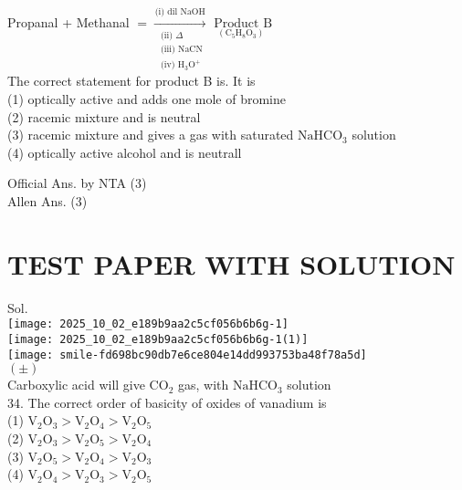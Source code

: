 \documentclass[10pt]{article}
\begin{document}
Propanal + Methanal \(=\xrightarrow[\substack{\text { (ii) } \Delta \\ \text { (iii) } \mathrm{NaCN} \\ \text { (iv) } \mathrm{H}_{3} \mathrm{O}^{+}}]{\text {(i) dil } \mathrm{NaOH}} \underset{\left(\mathrm{C}_{5} \mathrm{H}_{8} \mathrm{O}_{3}\right)}{\text { Product } \mathrm{B}}\)\\
The correct statement for product B is. It is\\
(1) optically active and adds one mole of bromine\\
(2) racemic mixture and is neutral\\
(3) racemic mixture and gives a gas with saturated \(\mathrm{NaHCO}_{3}\) solution\\
(4) optically active alcohol and is neutrall

Official Ans. by NTA (3)\\
Allen Ans. (3)

\section*{TEST PAPER WITH SOLUTION}
Sol.\\
\texttt{[image: 2025\_10\_02\_e189b9aa2c5cf056b6b6g-1]}\\
\texttt{[image: 2025\_10\_02\_e189b9aa2c5cf056b6b6g-1(1)]}\\
\texttt{[image: smile-fd698bc90db7e6ce804e14dd993753ba48f78a5d]}\\
\(( \pm)\)\\
Carboxylic acid will give \(\mathrm{CO}_{2}\) gas, with \(\mathrm{NaHCO}_{3}\) solution\\
34. The correct order of basicity of oxides of vanadium is\\
(1) \(\mathrm{V}_{2} \mathrm{O}_{3}>\mathrm{V}_{2} \mathrm{O}_{4}>\mathrm{V}_{2} \mathrm{O}_{5}\)\\
(2) \(\mathrm{V}_{2} \mathrm{O}_{3}>\mathrm{V}_{2} \mathrm{O}_{5}>\mathrm{V}_{2} \mathrm{O}_{4}\)\\
(3) \(\mathrm{V}_{2} \mathrm{O}_{5}>\mathrm{V}_{2} \mathrm{O}_{4}>\mathrm{V}_{2} \mathrm{O}_{3}\)\\
(4) \(\mathrm{V}_{2} \mathrm{O}_{4}>\mathrm{V}_{2} \mathrm{O}_{3}>\mathrm{V}_{2} \mathrm{O}_{5}\)
\end{document}
